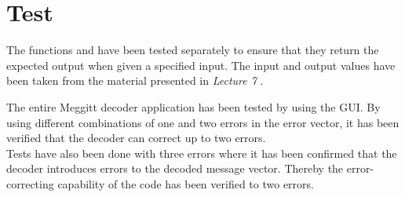 \documentclass[Main]{subfiles}
\begin{document}
\chapter{Test}
The functions  and  have been tested separately to ensure that they return the expected output when given a specified input. The input and output values have been taken from the material presented in \emph{Lecture 7} \cite{lec7}.

The entire Meggitt decoder application has been tested by using the GUI. By using different combinations of one and two errors in the error vector, it has been verified that the decoder can correct up to two errors.
\\Tests have also been done with three errors where it has been confirmed that the decoder introduces errors to the decoded message vector. Thereby the error-correcting capability of the code has been verified to two errors.  
\end{document}

